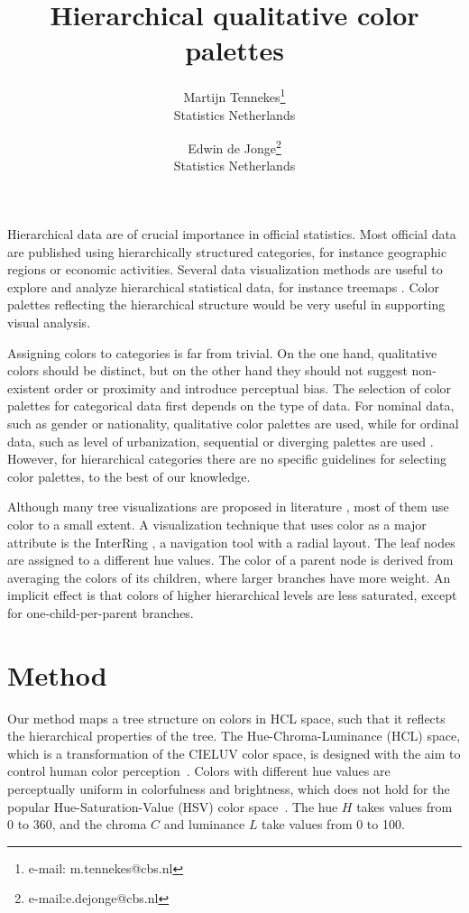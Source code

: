 \documentclass[review]{vgtc}                 %
\title{Hierarchical qualitative color palettes}
\author{Martijn Tennekes\thanks{e-mail: m.tennekes@cbs.nl}\\ %
        \scriptsize Statistics Netherlands %
\and Edwin de Jonge\thanks{e-mail:e.dejonge@cbs.nl}\\ %
     \scriptsize Statistics Netherlands}
\begin{document}

\maketitle

Hierarchical data are of crucial importance in official statistics. Most official data are published using hierarchically structured categories, for instance geographic regions or economic activities. Several data visualization methods are useful to explore and analyze hierarchical statistical data, for instance treemaps
\cite{shneiderman1992,tennekes2011b}. Color palettes reflecting the  hierarchical structure would be very useful in supporting visual analysis.

Assigning colors to categories is far from trivial. On the one hand, qualitative colors should be distinct, but on the other hand they should not suggest non-existent order or proximity and introduce perceptual bias. The selection of color palettes for categorical data first depends on the type of data. For nominal data, such as gender or nationality, qualitative color palettes are used, while for ordinal data, such as level of urbanization, sequential or diverging palettes are used \cite{brewer03, zeileis2009}. However, for hierarchical categories there are no specific guidelines for selecting color palettes, to the best of our knowledge.

Although many tree visualizations are proposed in literature \cite{schulz2011}, most of them use color to a small extent. A visualization technique that uses color as a major attribute is the InterRing \cite{yang2002}, a navigation tool with a radial layout. The leaf nodes are assigned to a different hue values. The color of a parent node is derived from averaging the colors of its children, where larger branches have more weight. An implicit effect is that colors of higher hierarchical levels are less saturated, except for one-child-per-parent branches.


\section{Method}

Our method maps a tree structure on colors in HCL space, such that it reflects the hierarchical properties of the tree. The Hue-Chroma-Luminance (HCL) space, which is a transformation of the CIELUV color space, is designed with the aim to control human color perception~\cite{ihaka2003}.
Colors with different hue values are perceptually uniform in colorfulness and brightness, which does not hold for the popular Hue-Saturation-Value (HSV) color space~\cite{zeileis2009}. The hue $H$ takes values from 0 to 360, and the chroma $C$ and luminance $L$ take values from 0 to 100.
\end{document}
